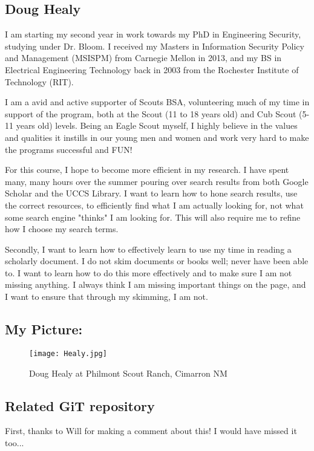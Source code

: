\subsection{Doug Healy}

I am starting my second year in work towards my PhD in Engineering Security, studying under Dr. Bloom. I received my Masters in Information Security Policy and Management (MSISPM) from Carnegie Mellon in 2013, and my BS in Electrical Engineering Technology back in 2003 from the Rochester Institute of Technology (RIT). 

I am a avid and active supporter of Scouts BSA, volunteering much of my time in support of the program, both at the Scout (11 to 18 years old) and Cub Scout (5-11 years old) levels. Being an Eagle Scout myself, I highly believe in the values and qualities it instills in our young men and women and work very hard to make the programs successful and FUN!  

For this course, I hope to become more efficient in my research. I have spent many, many hours over the summer pouring over search results from both Google Scholar and the UCCS Library. I want to learn how to hone search results, use the correct resources, to efficiently find what I am actually looking for, not what some search engine "thinks" I am looking for. This will also require me to refine how I choose my search terms.  

Secondly, I want to learn how to effectively learn to use my time in reading a scholarly document. I do not skim documents or books well; never have been able to. I want to learn how to do this more effectively and to make sure I am not missing anything. I always think I am missing important things on the page, and I want to ensure that through my skimming, I am not.   

\subsection{My Picture: }
\begin{figure}[htp]
    \centering
    \texttt{[image: Healy.jpg]}
    \caption{Doug Healy at Philmont Scout Ranch, Cimarron NM}
 \end{figure}
 
\subsection{Related GiT repository}
First, thanks to Will for making a comment about this! I would have missed it too...

